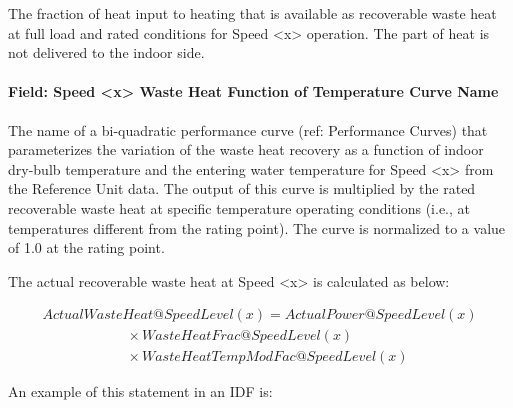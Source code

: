 The fraction of heat input to heating that is available as recoverable waste heat at full load and rated conditions for Speed \textless{}x\textgreater{} operation. The part of heat is not delivered to the indoor side.

\paragraph{Field: Speed \textless{}x\textgreater{} Waste Heat Function of Temperature Curve Name}\label{field-speed-x-waste-heat-function-of-temperature-curve-name-3}

The name of a bi-quadratic performance curve (ref: Performance Curves) that parameterizes the variation of the waste heat recovery as a function of indoor dry-bulb temperature and the entering water temperature for Speed \textless{}x\textgreater{} from the Reference Unit data. The output of this curve is multiplied by the rated recoverable waste heat at specific temperature operating conditions (i.e., at temperatures different from the rating point). The curve is normalized to a value of 1.0 at the rating point.

The actual recoverable waste heat at Speed \textless{}x\textgreater{} is calculated as below:

\begin{equation}
\begin{array}{l}
ActualWasteHeat@SpeedLevel\left( x \right) = ActualPower@SpeedLevel\left( x \right) \\
\quad \quad \quad \quad \quad \quad \times WasteHeatFrac@SpeedLevel(x) \\
\quad \quad \quad \quad \quad \quad \times WasteHeatTempModFac@SpeedLevel(x)
\end{array}
\end{equation}

An example of this statement in an IDF is:

